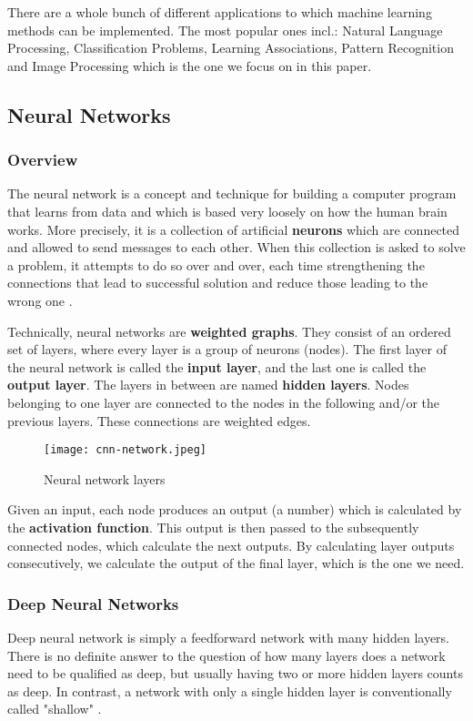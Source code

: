 \documentclass[../Main.tex]{subfiles}
\begin{document}
    There are a whole bunch of different applications to which machine learning methods can be implemented. The most popular ones \cite{MLgoogle} incl.: Natural Language Processing, Classification Problems, Learning Associations, Pattern Recognition and Image Processing which is the one we focus on in this paper.


\subsection{Neural Networks}
    \subsubsection{Overview}
    The neural network is a concept and technique for building a computer program that learns from data and which is based very loosely on how the human brain works. More precisely, it is a collection of artificial \textbf{neurons} which are connected and allowed to send messages to each other. When this collection is asked to solve a problem, it attempts to do so over and over, each time strengthening the connections that lead to successful solution and reduce those leading to the wrong one \cite{tfplayground}.
    
    Technically, neural networks are \textbf{weighted graphs}. They consist of an ordered set of layers, where every layer is a group of neurons (nodes). The first layer of the neural network is called the \textbf{input layer}, and the last one is called the \textbf{output layer}. The layers in between are named \textbf{hidden layers}. Nodes belonging to one layer are connected to the nodes in the following and/or the previous layers. These connections are weighted edges. \\ 
    \begin{figure}[ht!]
        \centering
        \texttt{[image: cnn-network.jpeg]}
        \caption{Neural network layers \cite{dlstanford}}
        \label{fig:nn-scheme}
    \end{figure}

    Given an input, each node produces an output (a number) which is calculated by the \textbf{activation function}. This output is then passed to the subsequently connected nodes, which calculate the next outputs. By calculating layer outputs consecutively, we calculate the output of the final layer, which is the one we need.
    
    \subsubsection{Deep Neural Networks}
    Deep neural network is simply a feedforward network with many hidden layers. 
    There is no definite answer to the question of how many layers does a network need to be qualified as deep, but usually having two or more hidden layers counts as deep. In contrast, a network with only a single hidden layer is conventionally called "shallow" \cite{Goodfellow-et-al-2016}.
    
\end{document}
